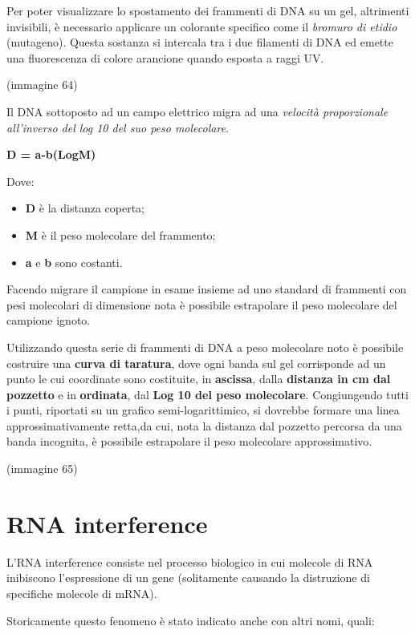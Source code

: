 \documentclass[]{article}
\begin{document}
Per poter visualizzare lo spostamento dei frammenti di DNA su un gel,
altrimenti invisibili, è necessario applicare un colorante specifico
come il \emph{bromuro di etidio} (mutageno). Questa sostanza si
intercala tra i due filamenti di DNA ed emette una fluorescenza di
colore arancione quando esposta a raggi UV.

(immagine 64)

Il DNA sottoposto ad un campo elettrico migra ad una \emph{velocità
proporzionale all'inverso del log 10 del suo peso molecolare}.

\textbf{D = a-b(LogM)}

Dove:

\begin{itemize}
\itemsep1pt\parskip0pt
\item
  \textbf{D} è la distanza coperta;
\item
  \textbf{M} è il peso molecolare del frammento;
\item
  \textbf{a} e \textbf{b} sono costanti.
\end{itemize}

Facendo migrare il campione in esame insieme ad uno standard di
frammenti con pesi molecolari di dimensione nota è possibile estrapolare
il peso molecolare del campione ignoto.

Utilizzando questa serie di frammenti di DNA a peso molecolare noto è
possibile costruire una \textbf{curva di taratura}, dove ogni banda sul
gel corrisponde ad un punto le cui coordinate sono costituite, in
\textbf{ascissa}, dalla \textbf{distanza in cm dal pozzetto} e in
\textbf{ordinata}, dal \textbf{Log 10 del peso molecolare}. Congiungendo
tutti i punti, riportati su un grafico semi-logarittimico, si dovrebbe
formare una linea approssimativamente retta,da cui, nota la distanza dal
pozzetto percorsa da una banda incognita, è possibile estrapolare il
peso molecolare approssimativo.

(immagine 65)

\section{RNA interference}\label{rna-interference}

L'RNA interference consiste nel processo biologico in cui molecole di
RNA inibiscono l'espressione di un gene (solitamente causando la
distruzione di specifiche molecole di mRNA).

Storicamente questo fenomeno è stato indicato anche con altri nomi,
quali:
\end{document}
